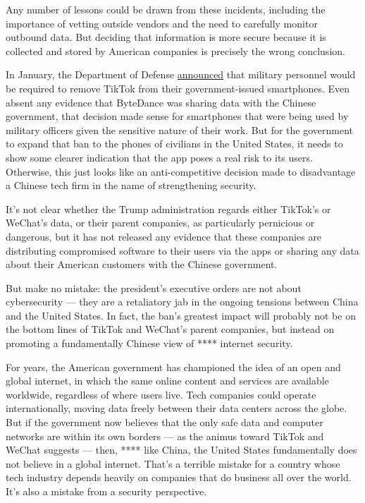 Any number of lessons could be drawn from these incidents, including the
importance of vetting outside vendors and the need to carefully monitor
outbound data. But deciding that information is more secure because it
is collected and stored by American companies is precisely the wrong
conclusion.

In January, the Department of Defense
\href{https://www.nytimes3xbfgragh.onion/2020/01/04/us/tiktok-pentagon-military-ban.html}{announced}
that military personnel would be required to remove TikTok from their
government-issued smartphones. Even absent any evidence that ByteDance
was sharing data with the Chinese government, that decision made sense
for smartphones that were being used by military officers given the
sensitive nature of their work. But for the government to expand that
ban to the phones of civilians in the United States, it needs to show
some clearer indication that the app poses a real risk to its users.
Otherwise, this just looks like an anti-competitive decision made to
disadvantage a Chinese tech firm in the name of strengthening security.

It's not clear whether the Trump administration regards either TikTok's
or WeChat's data, or their parent companies, as particularly pernicious
or dangerous, but it has not released any evidence that these companies
are distributing compromised software to their users via the apps or
sharing any data about their American customers with the Chinese
government.

But make no mistake: the president's executive orders are not about
cybersecurity --- they are a retaliatory jab in the ongoing tensions
between China and the United States. In fact, the ban's greatest impact
will probably not be on the bottom lines of TikTok and WeChat's parent
companies, but instead on promoting a fundamentally Chinese view of ****
internet security.

For years, the American government has championed the idea of an open
and global internet, in which the same online content and services are
available worldwide, regardless of where users live. Tech companies
could operate internationally, moving data freely between their data
centers across the globe. But if the government now believes that the
only safe data and computer networks are within its own borders --- as
the animus toward TikTok and WeChat suggests --- then, **** like China,
the United States fundamentally does not believe in a global internet.
That's a terrible mistake for a country whose tech industry depends
heavily on companies that do business all over the world. It's also a
mistake from a security perspective.

